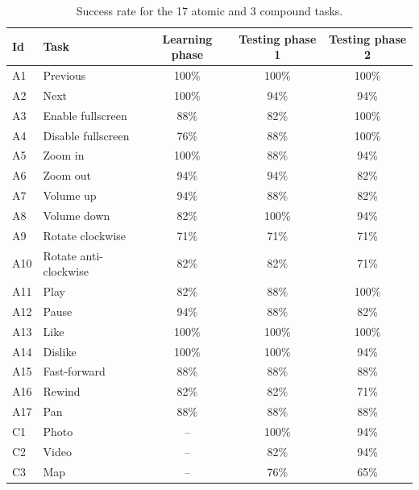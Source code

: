 \begin{table}[!hbt]
    \renewcommand{\arraystretch}{1.1}
    \footnotesize
    \centering
    \begin{tabular}{lp{3.45cm}ccc}
        \toprule
        \textbf{Id} & \textbf{Task} & \textbf{Learning phase} & \textbf{Testing phase 1} & \textbf{Testing phase 2} \\
        \midrule
        A1 & Previous & 100\% & 100\% & 100\%  \\ 
        A2 & Next & 100\% & 94\% & 94\%  \\ 
        A3 & Enable fullscreen & 88\% & 82\% & 100\%  \\ 
        A4 & Disable fullscreen & 76\% & 88\% & 100\%  \\ 
        A5 & Zoom in & 100\% & 88\% & 94\%  \\ 
        A6 & Zoom out & 94\% & 94\% & 82\%  \\ 
        A7 & Volume up & 94\% & 88\% & 82\%  \\ 
        A8 & Volume down & 82\% & 100\% & 94\%  \\ 
        A9 & Rotate clockwise & 71\% & 71\% & 71\%  \\ 
        A10 & Rotate anti-clockwise & 82\% & 82\% & 71\%  \\ 
        A11 & Play & 82\% & 88\% & 100\%  \\ 
        A12 & Pause & 94\% & 88\% & 82\%  \\ 
        A13 & Like & 100\% & 100\% & 100\%  \\ 
        A14 & Dislike & 100\% & 100\% & 94\%  \\ 
        A15 & Fast-forward & 88\% & 88\% & 88\%  \\ 
        A16 & Rewind & 82\% & 82\% & 71\%  \\ 
        A17 & Pan & 88\% & 88\% & 88\%  \\ 
        \midrule
        C1 & Photo & -- & 100\% & 94\%  \\ 
        C2 & Video & -- & 82\% & 94\%  \\ 
        C3 & Map & -- & 76\% & 65\% \\ 
        \bottomrule
    \end{tabular}
    \caption{Success rate for the 17 atomic and 3 compound tasks.}
	\label{tab:lui:success-rate}
\end{table}

